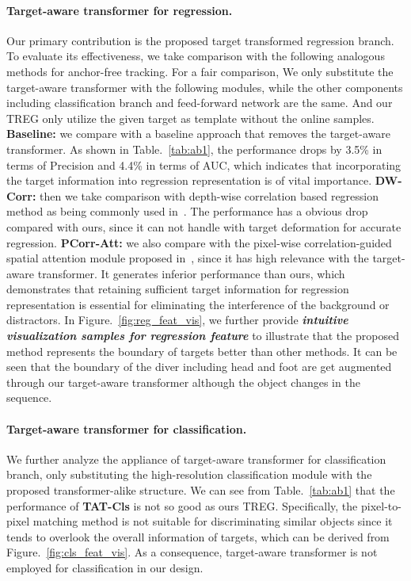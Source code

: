 \documentclass[10pt,twocolumn,letterpaper]{article}
\begin{document}
\paragraph{Target-aware transformer for regression.} Our primary contribution is the proposed target transformed regression branch. To evaluate its effectiveness, we take comparison with the following analogous methods for anchor-free tracking. For a fair comparison, We only substitute the target-aware transformer with the following modules, while the other components including classification branch and feed-forward network are the same. And our TREG only utilize the given target as template without the online samples. \textbf{Baseline:} we compare with a baseline approach that removes the target-aware transformer. As shown in Table.~\ref{tab:ab1}, the performance drops by 3.5\% in terms of Precision and 4.4\% in terms of AUC, which indicates that incorporating the target information into regression representation is of vital importance. \textbf{DW-Corr:} then we take comparison with depth-wise correlation based regression method as being commonly used in~\cite{ocean,siamban,siamcar,siamfc++}. The performance has a obvious drop compared with ours, since it can not handle with target deformation for accurate regression. \textbf{PCorr-Att:} we also compare with the pixel-wise correlation-guided spatial attention module proposed  in~\cite{CGACD}, since it has high relevance with the target-aware transformer. It generates inferior performance than ours, which demonstrates that retaining sufficient target information for regression representation is essential for eliminating the interference of the background or distractors. In Figure.~\ref{fig:reg_feat_vis}, we further provide \textbf{\textit{intuitive visualization samples for regression feature}} to illustrate that the proposed method represents the boundary of targets better than other methods. It can be seen that the boundary of the diver including head and foot are get augmented through our target-aware transformer although the object changes in the sequence. 

\paragraph{Target-aware transformer for classification.}
We further analyze the appliance of target-aware transformer for classification branch, only substituting the high-resolution classification module with the proposed transformer-alike structure. We can see from Table.~\ref{tab:ab1} that the performance of \textbf{TAT-Cls} is not so good as ours TREG. Specifically, the pixel-to-pixel matching method is not suitable for discriminating similar objects since it tends to overlook the overall information of targets, which can be derived from Figure.~\ref{fig:cls_feat_vis}. As a consequence, target-aware transformer is not employed for classification in our design.
\end{document}
